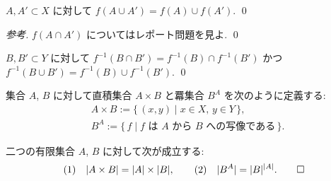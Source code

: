 \documentclass[12pt,twoside]{jarticle}
\begin{document}
\begin{question}[5点]
  $A,A'\subset X$ に対して $f(A\cup A')=f(A)\cup f(A')$. \qed
\end{question}

\begin{proof}[参考]
  $f(A\cap A')$ についてはレポート問題を見よ. \qed
\end{proof}

\begin{question}[5点]
  $B,B'\subset Y$ に対して %
  $f^{-1}(B\cap B') = f^{-1}(B)\cap f^{-1}(B')$ かつ \\%
  $f^{-1}(B\cup B') = f^{-1}(B)\cup f^{-1}(B')$.
  \qed
\end{question}

%


集合 $A$, $B$ に対して直積集合 $A\times B$ と羃集合 $B^A$ を次のように定義する:
\begin{align*}
  &
  A\times B := \{\,(x,y)\mid x\in X,\,y\in Y \,\},
  \\ &
  B^A := \{\, f \mid \text{$f$ は $A$ から $B$ への写像である} \,\}.
\end{align*}

\begin{question}[10点]
二つの有限集合 $A$, $B$ に対して次が成立する:
\[
  \text{(1)}\quad |A \times B| = |A| \times |B|,
  \qquad
  \text{(2)}\quad |B^A| = |B|^{|A|}.
\qed
\]
\end{question}


%
\end{document}
